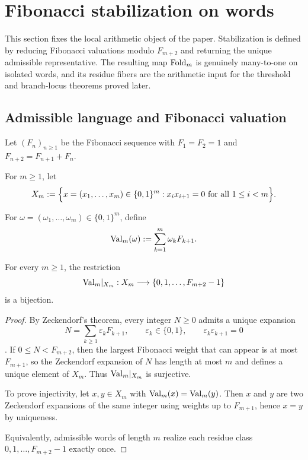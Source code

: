 \section{Fibonacci stabilization on words}\label{sec:stabilization}

This section fixes the local arithmetic object of the paper. Stabilization is defined by reducing Fibonacci valuations modulo $F_{m+2}$ and returning the unique admissible representative. The resulting map $\mathrm{Fold}_m$ is genuinely many-to-one on isolated words, and its residue fibers are the arithmetic input for the threshold and branch-locus theorems proved later.

\subsection{Admissible language and Fibonacci valuation}\label{sec:stab:golden}

Let $(F_n)_{n\ge 1}$ be the Fibonacci sequence with $F_1=F_2=1$ and $F_{n+2}=F_{n+1}+F_n$.

\begin{definition}\label{def:Xm}
For $m\ge 1$, let
\[
X_m := \Bigl\{x=(x_1,\dots,x_m)\in\{0,1\}^m : x_i x_{i+1}=0\ \text{for all }1\le i<m\Bigr\}.
\]
\end{definition}

\begin{definition}
For $\omega=(\omega_1,\dots,\omega_m)\in\{0,1\}^m$, define
\[
\mathrm{Val}_m(\omega):=\sum_{k=1}^m \omega_k F_{k+1}.
\]
\end{definition}

\begin{proposition}\label{prop:finite-window-range}
For every $m\ge 1$, the restriction
\[
\mathrm{Val}_m|_{X_m}:X_m\longrightarrow \{0,1,\dots,F_{m+2}-1\}
\]
is a bijection.
\end{proposition}

\begin{proof}
By Zeckendorf's theorem, every integer $N\ge 0$ admits a unique expansion
\[
N=\sum_{k\ge 1}\varepsilon_k F_{k+1},\qquad \varepsilon_k\in\{0,1\},\qquad \varepsilon_k\varepsilon_{k+1}=0
\]
\cite{Zeckendorf1972,Lothaire2002}. If $0\le N < F_{m+2}$, then the largest Fibonacci weight that can appear is at most $F_{m+1}$, so the Zeckendorf expansion of $N$ has length at most $m$ and defines a unique element of $X_m$. Thus $\mathrm{Val}_m|_{X_m}$ is surjective.

To prove injectivity, let $x,y\in X_m$ with $\mathrm{Val}_m(x)=\mathrm{Val}_m(y)$. Then $x$ and $y$ are two Zeckendorf expansions of the same integer using weights up to $F_{m+1}$, hence $x=y$ by uniqueness.

Equivalently, admissible words of length $m$ realize each residue class $0,1,\dots,F_{m+2}-1$ exactly once.
\end{proof}

